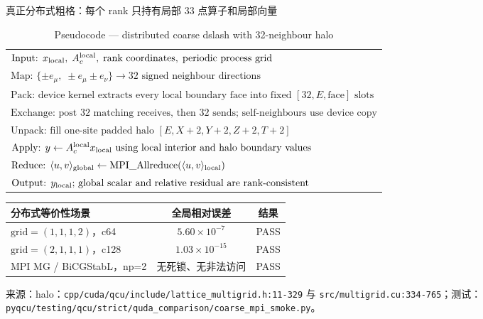 \documentclass[UTF8,aspectratio=169,11pt]{ctexbeamer}
\newcommand{\source}[1]{%
  \vspace{0.06em}\par{\raggedright\scriptsize\color{muted}来源：#1\par}}
\newcommand{\code}[1]{\nolinkurl{#1}}
\newcommand{\passmark}{\textcolor{evidence}{PASS}}
\begin{document}
\begin{frame}[t]{真正分布式粗格：每个 rank 只持有局部 33 点算子和局部向量}
  \begin{table}[htbp]
    \centering
    \caption*{Pseudocode — distributed coarse dslash with 32-neighbour halo}
    \small
    \renewcommand{\arraystretch}{0.80}
    \begin{tabular}{@{}l@{}}
      $\text{Input: }x_{\rm local},\;A_c^{\rm local},\;\text{rank coordinates},\;\text{periodic process grid}$ \\
      $\text{Map: }\{\pm e_\mu,\;\pm e_\mu\pm e_\nu\}\to\text{32 signed neighbour directions}$ \\
      $\text{Pack: }\text{device kernel extracts every local boundary face into fixed }[32,E,\text{face}]\text{ slots}$ \\
      $\text{Exchange: }\text{post 32 matching receives, then 32 sends; self-neighbours use device copy}$ \\
      $\text{Unpack: }\text{fill one-site padded halo }[E,X+2,Y+2,Z+2,T+2]$ \\
      $\text{Apply: }y\gets A_c^{\rm local}x_{\rm local}\text{ using local interior and halo boundary values}$ \\
      $\text{Reduce: }\langle u,v\rangle_{\rm global}\gets\mathrm{MPI\_Allreduce}(\langle u,v\rangle_{\rm local})$ \\
      $\text{Output: }y_{\rm local}\text{; global scalar and relative residual are rank-consistent}$
    \end{tabular}
  \end{table}
  \vspace{-0.05em}
  \begin{center}
    \small
    \renewcommand{\arraystretch}{0.82}
    \begin{tabular}{@{}lcc@{}}
      \toprule
      分布式等价性场景 & 全局相对误差 & 结果 \\
      \midrule
      $\mathrm{grid}=(1,1,1,2)$，c64 & $5.60\times10^{-7}$ & \passmark{} \\
      $\mathrm{grid}=(2,1,1,1)$，c128 & $1.03\times10^{-15}$ & \passmark{} \\
      MPI MG / BiCGStabL，np=2 & 无死锁、无非法访问 & \passmark{} \\
      \bottomrule
    \end{tabular}
  \end{center}
  \source{halo：\code{cpp/cuda/qcu/include/lattice_multigrid.h:11-329} 与 \code{src/multigrid.cu:334-765}；测试：\code{pyqcu/testing/qcu/strict/quda_comparison/coarse_mpi_smoke.py}。}
\end{frame}
\end{document}
